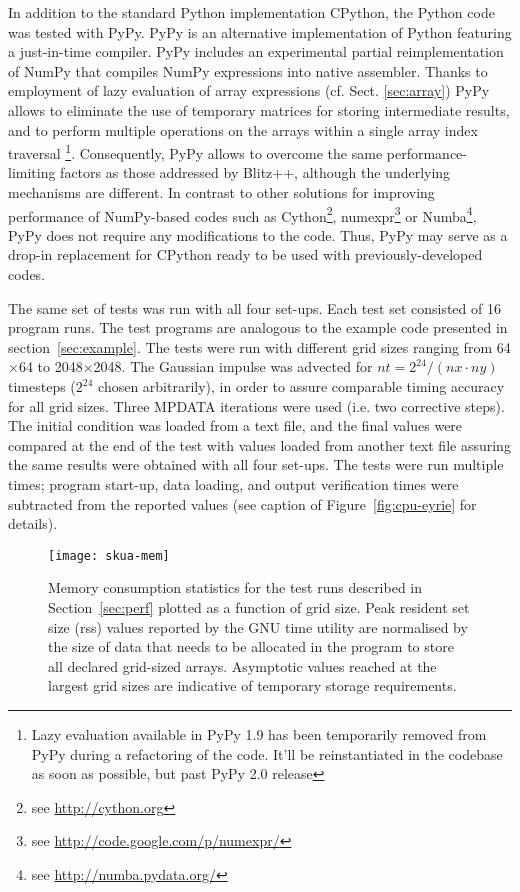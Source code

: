 \documentclass[gmd]{copernicus}%
\begin{document}
  In addition to the standard Python implementation CPython,
    the Python code was tested with PyPy.
  PyPy is an alternative implementation of Python featuring a just-in-time compiler. 
  PyPy includes an experimental partial reimplementation of NumPy that compiles NumPy expressions into native assembler.
  Thanks to employment of lazy evaluation of array expressions (cf. Sect. \ref{sec:array})
    PyPy allows to eliminate the use of temporary matrices for storing intermediate results,
    and to perform multiple operations on the arrays within a single array index traversal
    \footnote{Lazy evaluation available in PyPy 1.9 has been temporarily removed from PyPy during a refactoring of
      the code. It'll be reinstantiated in the codebase as soon as possible, but past PyPy 2.0 release}.
  Consequently, PyPy allows to overcome the same performance-limiting factors as those addressed by Blitz++, although 
    the underlying mechanisms are different.
  In contrast to other solutions for improving performance of NumPy-based codes such as
    Cython\footnote{see \url{http://cython.org}}, 
    numexpr\footnote{see \url{http://code.google.com/p/numexpr/}} or 
    Numba\footnote{see \url{http://numba.pydata.org/}}, 
    PyPy does not require any modifications to the code.
  Thus, PyPy may serve as a drop-in replacement for CPython ready to be used with 
    previously-developed codes.
  
  The same set of tests was run with all four set-ups.
  Each test set consisted of 16 program runs.
  The test programs are analogous to the example code presented in section~\ref{sec:example}.
  The tests were run with different grid sizes ranging from 64$\times$64 to 2048$\times$2048.
  The Gaussian impulse was advected for $nt=2^{24}/(nx\cdot ny)$ timesteps ($2^{24}$ chosen arbitrarily), 
    in order to assure comparable timing accuracy for all grid sizes.
  Three MPDATA iterations were used (i.e. two corrective steps).
  The initial condition was loaded from a text file, and the final values were compared at the end of the test
    with values loaded from another text file assuring the same results were obtained with all four set-ups.
  The tests were run multiple times; program start-up, data loading, and output verification times were
    subtracted from the reported values (see caption of Figure~\ref{fig:cpu-eyrie} for details).

  \begin{figure}[t]
    \center
    \texttt{[image: skua-mem]}
    \caption{\label{fig:mem}
      Memory consumption statistics for the test runs described in Section~\ref{sec:perf}
        plotted as a function of grid size.
      Peak resident set size (rss) values reported by the GNU time utility are normalised by the size of
        data that needs to be allocated in the program to store all declared grid-sized arrays.
      Asymptotic values reached at the largest grid sizes are indicative 
        of temporary storage requirements.
    }
  \end{figure}
\end{document}
